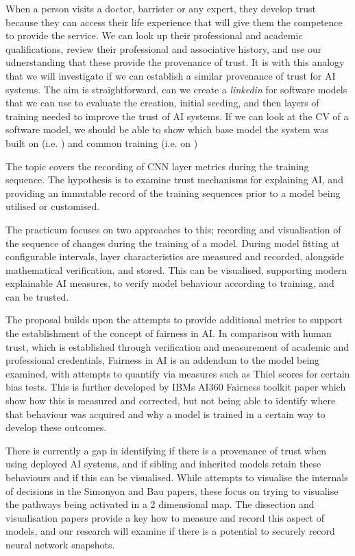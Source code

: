 When a person visits a doctor, barrister or any expert, they develop trust because they can access their life experience that will give them the competence to provide the service. We can look up their professional and academic qualifications, review their professional and associative history, and use our udnerstanding that these provide the provenance of trust. It is with this analogy that we will investigate if we can establish a similar provenance of trust for AI systems. The aim is straightforward, can we create a \textit{linkedin} for software models that we can use to evaluate the creation, initial seeding, and then layers of training needed to improve the trust of AI systems. If we can look at the CV of a software model, we should be able to show which base model the system was built on (i.e.  \cite{project_sherpa_httpswwwproject-sherpaeuethics-by-design_2019}) and common training (i.e. on \cite{deng_imagenet_2009})

The topic covers the recording of CNN layer metrics during the training
sequence. The hypothesis is to examine trust mechanisms for explaining AI, and
providing an immutable record of the training sequences prior to a model being
utilised or customised.

The practicum focuses on two approaches to this;
recording and visualisation of the sequence of changes during the training of a
model. During model fitting at configurable intervals, layer characteristics are
measured and recorded, alongside mathematical verification, and stored. This can
be visualised, supporting modern explainable AI measures, to verify model
behaviour according to training, and can be trusted.

The proposal builds upon the attempts to provide additional metrics to support
the establishment of the concept of fairness in AI. In comparison with human
trust, which is established through verification and measurement of academic and
professional credentials, Fairness in AI is an addendum to the model being
examined, with attempts to quantify via measures such as Thiel scores for
certain bias tests. This is further developed by IBMs AI360 Fairness toolkit
paper which show how this is measured and corrected, but not being able to
identify where that behaviour was acquired and why a model is trained in a
certain way to develop these outcomes.

There is currently a gap in identifying if there is a provenance of trust when using deployed AI systems, and if sibling
and inherited models retain these behaviours and if this can be visualised.
While attempts to visualise the internals of decisions in the Simonyon and Bau
papers, these focus on trying to visualise the pathways being activated in a 2
dimensional map. The dissection and visualisation papers provide a key how to
measure and record this aspect of models, and our research will examine if there
is a potential to securely record neural network snapshots.
 
